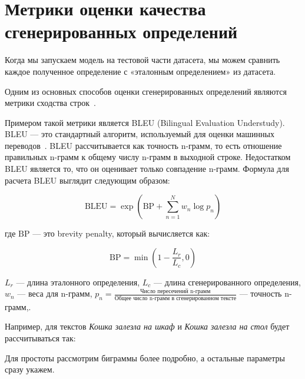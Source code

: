 \documentclass[LI,VKR]{HSEUniversity}
\begin{document}
\section{Метрики оценки качества сгенерированных определений}

Когда мы запускаем модель на тестовой части датасета,
мы можем сравнить каждое полученное определение с «эталонным определением» из датасета.

Одним из основных способов оценки сгенерированных определений являются метрики
сходства строк~\cite{DefinitionModelingReviewAndDatasetAnalysis}.

Примером такой метрики является BLEU (Bilingual Evaluation Understudy).
BLEU — это стандартный алгоритм, используемый для оценки машинных переводов~\cite{BLUE}.
BLEU рассчитывается как точность n-грамм, то есть отношение правильных n-грамм к общему числу n-грамм в выходной строке.
Недостатком BLEU является то, что он оценивает только совпадение n-грамм.
Формула для расчета BLEU выглядит следующим образом:

\[
\text{BLEU} = \exp \left( \text{BP} + \sum_{n=1}^{N} w_n \log p_n \right)
\]

где \(\text{BP}\) — это brevity penalty, который вычисляется как:

\[
\text{BP} = \min\left(1 - \frac{L_r}{L_c}, 0 \right)
\]

\(L_r\) — длина эталонного определения,
\(L_c\) — длина сгенерированного определения,
\(w_n\) — веса для n-грамм,
\(p_n = \frac{\text{Число пересечений n-грамм}}{\text{Общее число n-грамм в сгенерированном тексте}}\) — точность n-грамм,.

Например, для текстов \textit{Кошка залезла на шкаф} и \textit{Кошка залезла на стол} будет рассчитываться так:

Для простоты рассмотрим биграммы более подробно, а остальные параметры сразу укажем.
\end{document}
